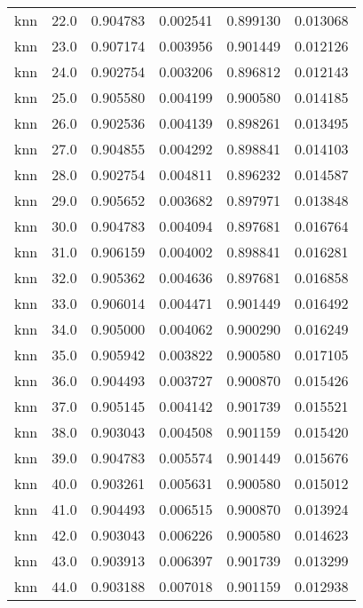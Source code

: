 \begin{tabular}{lrrrrr}
     knn &       22.0 &    0.904783 &   0.002541 &   0.899130 &  0.013068 \\
     knn &       23.0 &    0.907174 &   0.003956 &   0.901449 &  0.012126 \\
     knn &       24.0 &    0.902754 &   0.003206 &   0.896812 &  0.012143 \\
     knn &       25.0 &    0.905580 &   0.004199 &   0.900580 &  0.014185 \\
     knn &       26.0 &    0.902536 &   0.004139 &   0.898261 &  0.013495 \\
     knn &       27.0 &    0.904855 &   0.004292 &   0.898841 &  0.014103 \\
     knn &       28.0 &    0.902754 &   0.004811 &   0.896232 &  0.014587 \\
     knn &       29.0 &    0.905652 &   0.003682 &   0.897971 &  0.013848 \\
     knn &       30.0 &    0.904783 &   0.004094 &   0.897681 &  0.016764 \\
     knn &       31.0 &    0.906159 &   0.004002 &   0.898841 &  0.016281 \\
     knn &       32.0 &    0.905362 &   0.004636 &   0.897681 &  0.016858 \\
     knn &       33.0 &    0.906014 &   0.004471 &   0.901449 &  0.016492 \\
     knn &       34.0 &    0.905000 &   0.004062 &   0.900290 &  0.016249 \\
     knn &       35.0 &    0.905942 &   0.003822 &   0.900580 &  0.017105 \\
     knn &       36.0 &    0.904493 &   0.003727 &   0.900870 &  0.015426 \\
     knn &       37.0 &    0.905145 &   0.004142 &   0.901739 &  0.015521 \\
     knn &       38.0 &    0.903043 &   0.004508 &   0.901159 &  0.015420 \\
     knn &       39.0 &    0.904783 &   0.005574 &   0.901449 &  0.015676 \\
     knn &       40.0 &    0.903261 &   0.005631 &   0.900580 &  0.015012 \\
     knn &       41.0 &    0.904493 &   0.006515 &   0.900870 &  0.013924 \\
     knn &       42.0 &    0.903043 &   0.006226 &   0.900580 &  0.014623 \\
     knn &       43.0 &    0.903913 &   0.006397 &   0.901739 &  0.013299 \\
     knn &       44.0 &    0.903188 &   0.007018 &   0.901159 &  0.012938 \\

\end{tabular}
